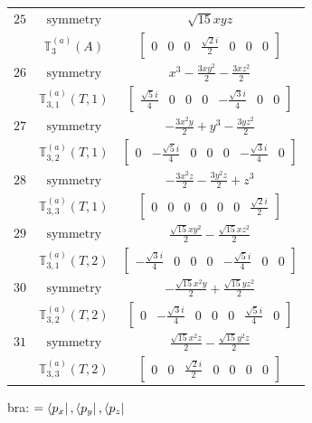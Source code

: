 \documentclass[fleqn,8pt,landscape]{jsarticle}
\begin{document}
\begin{longtable}{ccc}
$ 25 $ & $ \text{symmetry} $ & $ \sqrt{15} x y z $ \\
$  $ & $ \mathbb{T}_{3}^{(a)}(A) $ & $ \begin{bmatrix} 0 & 0 & 0 & \frac{\sqrt{2} i}{2} & 0 & 0 & 0 \end{bmatrix} $ \\ \hline
$ 26 $ & $ \text{symmetry} $ & $ x^{3} - \frac{3 x y^{2}}{2} - \frac{3 x z^{2}}{2} $ \\
$  $ & $ \mathbb{T}_{3,1}^{(a)}(T,1) $ & $ \begin{bmatrix} \frac{\sqrt{5} i}{4} & 0 & 0 & 0 & - \frac{\sqrt{3} i}{4} & 0 & 0 \end{bmatrix} $ \\ \hline
$ 27 $ & $ \text{symmetry} $ & $ - \frac{3 x^{2} y}{2} + y^{3} - \frac{3 y z^{2}}{2} $ \\
$  $ & $ \mathbb{T}_{3,2}^{(a)}(T,1) $ & $ \begin{bmatrix} 0 & - \frac{\sqrt{5} i}{4} & 0 & 0 & 0 & - \frac{\sqrt{3} i}{4} & 0 \end{bmatrix} $ \\ \hline
$ 28 $ & $ \text{symmetry} $ & $ - \frac{3 x^{2} z}{2} - \frac{3 y^{2} z}{2} + z^{3} $ \\
$  $ & $ \mathbb{T}_{3,3}^{(a)}(T,1) $ & $ \begin{bmatrix} 0 & 0 & 0 & 0 & 0 & 0 & \frac{\sqrt{2} i}{2} \end{bmatrix} $ \\ \hline
$ 29 $ & $ \text{symmetry} $ & $ \frac{\sqrt{15} x y^{2}}{2} - \frac{\sqrt{15} x z^{2}}{2} $ \\
$  $ & $ \mathbb{T}_{3,1}^{(a)}(T,2) $ & $ \begin{bmatrix} - \frac{\sqrt{3} i}{4} & 0 & 0 & 0 & - \frac{\sqrt{5} i}{4} & 0 & 0 \end{bmatrix} $ \\ \hline
$ 30 $ & $ \text{symmetry} $ & $ - \frac{\sqrt{15} x^{2} y}{2} + \frac{\sqrt{15} y z^{2}}{2} $ \\
$  $ & $ \mathbb{T}_{3,2}^{(a)}(T,2) $ & $ \begin{bmatrix} 0 & - \frac{\sqrt{3} i}{4} & 0 & 0 & 0 & \frac{\sqrt{5} i}{4} & 0 \end{bmatrix} $ \\ \hline
$ 31 $ & $ \text{symmetry} $ & $ \frac{\sqrt{15} x^{2} z}{2} - \frac{\sqrt{15} y^{2} z}{2} $ \\
$  $ & $ \mathbb{T}_{3,3}^{(a)}(T,2) $ & $ \begin{bmatrix} 0 & 0 & \frac{\sqrt{2} i}{2} & 0 & 0 & 0 & 0 \end{bmatrix} $ \\ \hline
\end{longtable}
bra: $=\bra{p_{x}}, \bra{p_{y}}, \bra{p_{z}}$
\end{document}
